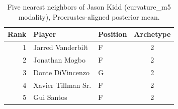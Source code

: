 \begin{table}[htbp]
  \centering\small
  \begin{tabular}{rllc}
    \toprule
    Rank & Player & Position & Archetype \\
    \midrule
    1 & Jarred Vanderbilt & F & 2 \\
    2 & Jonathan Mogbo & F & 2 \\
    3 & Donte DiVincenzo & G & 2 \\
    4 & Xavier Tillman Sr. & F & 2 \\
    5 & Gui Santos & F & 2 \\
    \bottomrule
  \end{tabular}
  \caption{Five nearest neighbors of Jason Kidd (curvature_m5 modality), Procrustes-aligned posterior mean.}
  \label{tab:Jason_Kidd_neighbors_curvature_m5}
\end{table}

